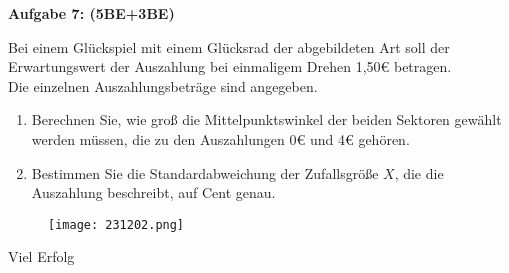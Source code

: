 \documentclass[a4paper,12pt]{article}
\newcommand{\Aufgabe}[1]{
  {
  \vspace*{0.5cm}
  \textsf{\textbf{Aufgabe #1}}
  \vspace*{0.2cm}
  
  }
}
\begin{document}
\Aufgabe{7: (5BE+3BE)}
\begin{minipage}[t]{0.7\textwidth}
  Bei einem Glückspiel mit einem Glücksrad der abgebildeten Art soll der Erwartungswert der Auszahlung bei einmaligem Drehen 1,50\euro{} betragen.\\
  Die einzelnen Auszahlungsbeträge sind angegeben.
  \begin{enumerate}[label={\alph*)}]
    \item Berechnen Sie, wie groß die Mittelpunktswinkel der beiden Sektoren gewählt werden müssen, die zu den Auszahlungen 0\euro{} und 4\euro{} gehören.
    \item Bestimmen Sie die Standardabweichung der Zufallsgröße $X$, die die Auszahlung beschreibt, auf Cent genau.
  \end{enumerate}
\end{minipage}
\hspace*{0.75cm}
\begin{minipage}[t]{0.3\textwidth}
  \begin{figure}[H]
    \vspace{0cm}
    \centering
    \texttt{[image: 231202.png]}
  \end{figure}
\end{minipage}



\vspace{2cm}
\centerline{Viel Erfolg \faThumbsOUp }
\end{document}
